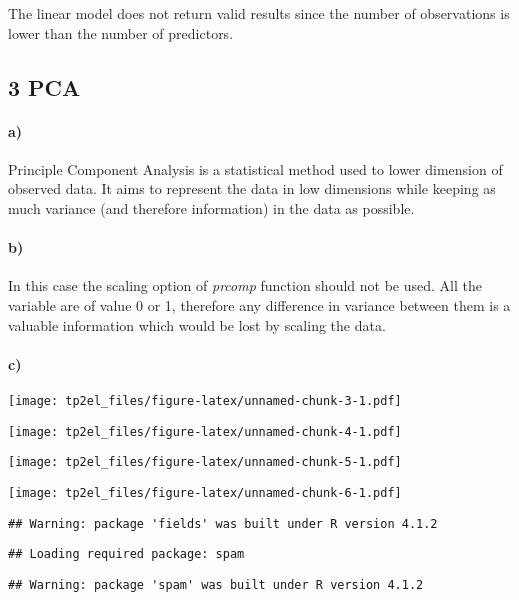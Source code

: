 \documentclass[
]{article}
\begin{document}
The linear model does not return valid results since the number of
observations is lower than the number of predictors.

\hypertarget{pca}{%
\subsection{3 PCA}\label{pca}}

\hypertarget{a}{%
\paragraph{a)}\label{a}}

Principle Component Analysis is a statistical method used to lower
dimension of observed data. It aims to represent the data in low
dimensions while keeping as much variance (and therefore information) in
the data as possible.

\hypertarget{b}{%
\paragraph{b)}\label{b}}

In this case the scaling option of \emph{prcomp} function should not be
used. All the variable are of value 0 or 1, therefore any difference in
variance between them is a valuable information which would be lost by
scaling the data.

\hypertarget{c}{%
\paragraph{c)}\label{c}}

\texttt{[image: tp2el\_files/figure-latex/unnamed-chunk-3-1.pdf]}

\texttt{[image: tp2el\_files/figure-latex/unnamed-chunk-4-1.pdf]}

\texttt{[image: tp2el\_files/figure-latex/unnamed-chunk-5-1.pdf]}

\texttt{[image: tp2el\_files/figure-latex/unnamed-chunk-6-1.pdf]}

\begin{verbatim}
## Warning: package 'fields' was built under R version 4.1.2
\end{verbatim}

\begin{verbatim}
## Loading required package: spam
\end{verbatim}

\begin{verbatim}
## Warning: package 'spam' was built under R version 4.1.2
\end{verbatim}
\end{document}
